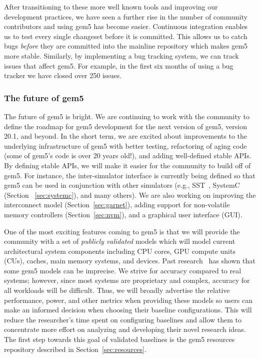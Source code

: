 After transitioning to these more well known tools and improving our development practices, we have seen a further rise in the number of community contributors and using gem5 has become easier.
Continuous integration enables us to test every single changeset before it is committed.
This allows us to catch bugs \emph{before} they are committed into the mainline repository which makes gem5 more stable.
Similarly, by implementing a bug tracking system, we can track issues that affect gem5.
For example, in the first six months of using a bug tracker we have closed over 250 issues.

\subsubsection*{The future of gem5}
The future of gem5 is bright.
We are continuing to work with the community to define the roadmap for gem5 development for the next version of gem5, version 20.1, and beyond.
In the short term, we are excited about improvements to the underlying infrastructure of gem5 with better testing, refactoring of aging code (some of gem5's code is over 20 years old!), and adding well-defined stable APIs.
By defining stable APIs, we will make it easier for the community to build off of gem5.
For instance, the inter-simulator interface is currently being defined so that gem5 can be used in conjunction with other simulators (e.g., SST~\cite{RodriguesHemmert2011-sst, HsiehPedretti2012-sst-gem5}, SystemC (Section ~\ref{sec:systemc}), and many others).
We are also working on improving the interconnect model (Section~\ref{sec:garnet}), adding support for non-volatile memory controllers (Section~\ref{sec:nvm}), and a graphical user interface (GUI).

One of the most exciting features coming to gem5 is that we will provide the community with a set of \emph{publicly validated} models which will model current architectural system components including CPU cores, GPU compute units (CUs), caches, main memory systems, and devices.
Past research~\cite{butko2012accuracy, nowatzki2015architectural, endo2014micro, akram201686, asri2016simulator, akram2019validation, gutierrez2014sources, jo2018diagsim, tanimoto2017dependence, walker2018hardware} has shown that some gem5 models can be imprecise.
We strive for accuracy compared to real systems; however, since most systems are proprietary and complex, accuracy for all workloads will be difficult.
Thus, we will broadly advertise the relative performance, power, and other metrics when providing these models so users can make an informed decision when choosing their baseline configurations.
This will reduce the researcher's time spent on configuring baselines and allow them to concentrate more effort on analyzing and developing their novel research ideas.
The first step towards this goal of validated baselines is the gem5 resources repository described in Section~\ref{sec:resources}.

